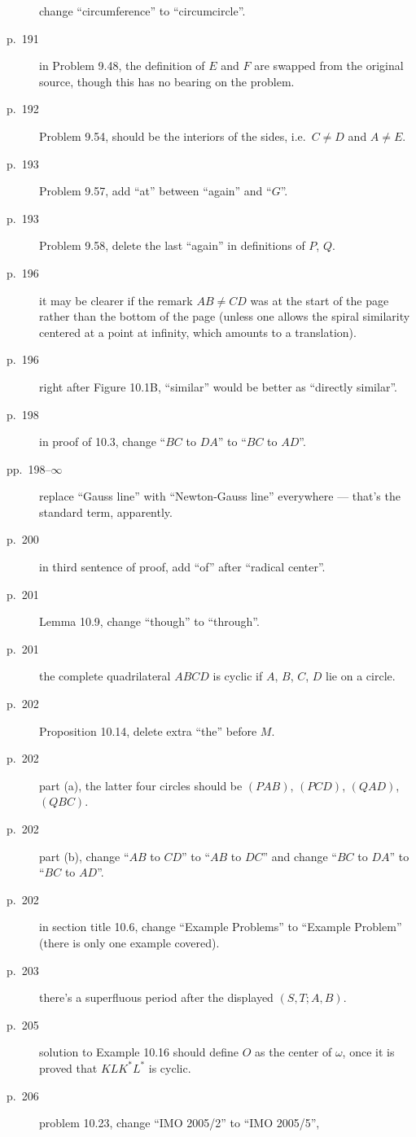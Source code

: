 \documentclass[11pt]{scrartcl}
\begin{document}
\begin{description}
  change ``circumference'' to ``circumcircle''.
\item[p.\  191] in Problem 9.48, the definition of $E$ and $F$ are swapped from
  the original source, though this has no bearing on the problem.
\item[p.\  192] Problem 9.54, should be the interiors of the sides, i.e.\ $C \neq D$ and $A \neq E$.
\item[p.\  193] Problem 9.57, add ``at'' between ``again'' and ``$G$''.
\item[p.\  193] Problem 9.58, delete the last ``again'' in definitions of $P$, $Q$.
\item[p.\  196] it may be clearer if the remark $AB \neq CD$ was at the
  start of the page rather than the bottom of the page
  (unless one allows the spiral similarity centered at a point at infinity,
  which amounts to a translation).
\item[p.\  196] right after Figure 10.1B, ``similar'' would be better as ``directly similar''.
\item[p.\  198] in proof of 10.3, change ``$BC$ to $DA$'' to ``$BC$ to $AD$''.
\item[pp.\  198--$\infty$] replace ``Gauss line'' with ``Newton-Gauss line''
  everywhere --- that's the standard term, apparently.
\item[p.\  200] in third sentence of proof, add ``of'' after ``radical center''.
\item[p.\  201] Lemma 10.9, change ``though'' to ``through''.
\item[p.\  201] the complete quadrilateral $ABCD$ is cyclic if $A$, $B$, $C$, $D$ lie on a circle.
\item[p.\  202] Proposition 10.14, delete extra ``the'' before $M$.
\item[p.\  202] part (a), the latter four circles should be
  $(PAB)$, $(PCD)$, $(QAD)$, $(QBC)$.
\item[p.\  202] part (b), change ``$AB$ to $CD$'' to ``$AB$ to $DC$''
  and change ``$BC$ to $DA$'' to ``$BC$ to $AD$''.
\item[p.\  202] in section title 10.6, change ``Example Problems'' to ``Example Problem''
  (there is only one example covered).
\item[p.\  203] there's a superfluous period after the displayed $(S,T;A,B)$.
\item[p.\  205] solution to Example 10.16 should define $O$ as the center of $\omega$,
  once it is proved that $KL K^\ast L^\ast$ is cyclic.
\item[p.\  206] problem 10.23, change ``IMO 2005/2'' to ``IMO 2005/5'',

\end{description}
\end{document}

